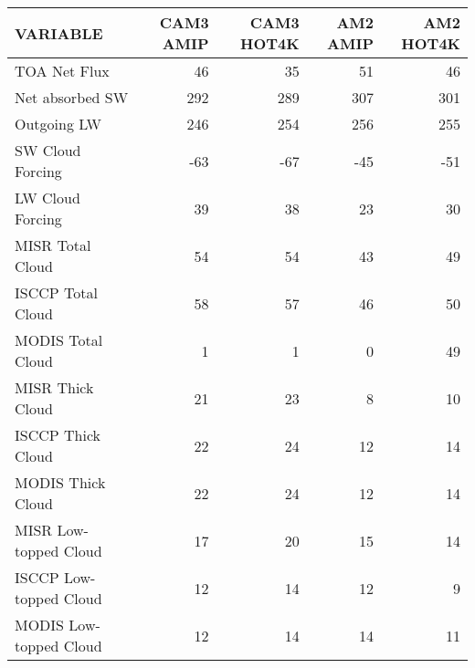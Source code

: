 \begin{tabular}{lrrrr}
\hline
                VARIABLE &                CAM3 AMIP &               CAM3 HOT4K &                 AM2 AMIP &                AM2 HOT4K \\ \hline
            TOA Net Flux &                       46 &                       35 &                       51 &                       46 \\
         Net absorbed SW &                      292 &                      289 &                      307 &                      301 \\
             Outgoing LW &                      246 &                      254 &                      256 &                      255 \\
        SW Cloud Forcing &                      -63 &                      -67 &                      -45 &                      -51 \\
        LW Cloud Forcing &                       39 &                       38 &                       23 &                       30 \\
        MISR Total Cloud &                       54 &                       54 &                       43 &                       49 \\
       ISCCP Total Cloud &                       58 &                       57 &                       46 &                       50 \\
       MODIS Total Cloud &                        1 &                        1 &                        0 &                       49 \\
        MISR Thick Cloud &                       21 &                       23 &                        8 &                       10 \\
       ISCCP Thick Cloud &                       22 &                       24 &                       12 &                       14 \\
       MODIS Thick Cloud &                       22 &                       24 &                       12 &                       14 \\
   MISR Low-topped Cloud &                       17 &                       20 &                       15 &                       14 \\
  ISCCP Low-topped Cloud &                       12 &                       14 &                       12 &                        9 \\
  MODIS Low-topped Cloud &                       12 &                       14 &                       14 &                       11 \\

\end{tabular}
